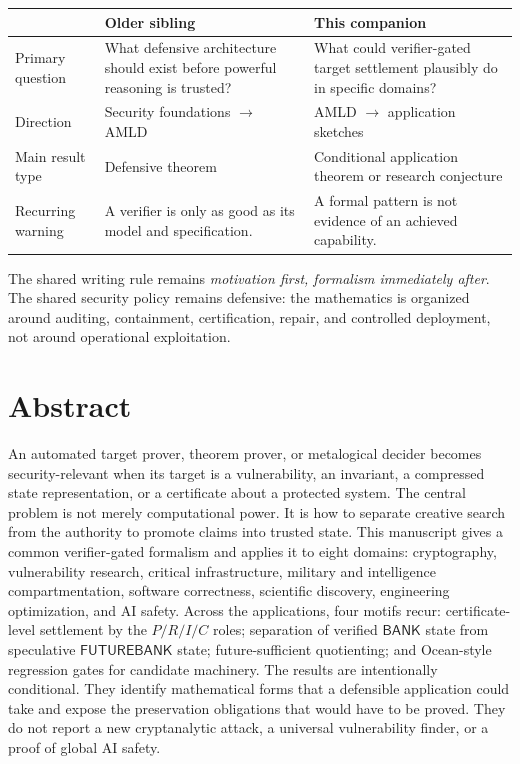 \documentclass[11pt,oneside]{book}
\theoremstyle{definition}
\theoremstyle{remark}
\newcommand{\BANK}{\mathsf{BANK}}
\newcommand{\FB}{\mathsf{FUTUREBANK}}
\begin{document}
\begin{center}
\begin{tabularx}{0.93\textwidth}{>{\raggedright\arraybackslash}p{}X X}
\toprule
 & Older sibling & This companion \\
\midrule
Primary question & What defensive architecture should exist before powerful reasoning is trusted? &
What could verifier-gated target settlement plausibly do in specific domains? \\
Direction & Security foundations $\rightarrow$ AMLD & AMLD $\rightarrow$ application sketches \\
Main result type & Defensive theorem & Conditional application theorem or research conjecture \\
Recurring warning & A verifier is only as good as its model and specification. & A formal pattern is not evidence of an achieved capability. \\
\bottomrule
\end{tabularx}
\end{center}

The shared writing rule remains \emph{motivation first, formalism immediately after}. The shared
security policy remains defensive: the mathematics is organized around auditing, containment,
certification, repair, and controlled deployment, not around operational exploitation.

\chapter*{Abstract}
An automated target prover, theorem prover, or metalogical decider becomes security-relevant when
its target is a vulnerability, an invariant, a compressed state representation, or a certificate about
a protected system. The central problem is not merely computational power. It is how to separate
creative search from the authority to promote claims into trusted state. This manuscript gives a
common verifier-gated formalism and applies it to eight domains: cryptography, vulnerability
research, critical infrastructure, military and intelligence compartmentation, software correctness,
scientific discovery, engineering optimization, and AI safety. Across the applications, four motifs
recur: certificate-level settlement by the $P/R/I/C$ roles; separation of verified \(\BANK\) state from
speculative \(\FB\) state; future-sufficient quotienting; and Ocean-style regression gates for
candidate machinery. The results are intentionally conditional. They identify mathematical forms
that a defensible application could take and expose the preservation obligations that would have to
be proved. They do not report a new cryptanalytic attack, a universal vulnerability finder, or a proof
of global AI safety.
\end{document}
